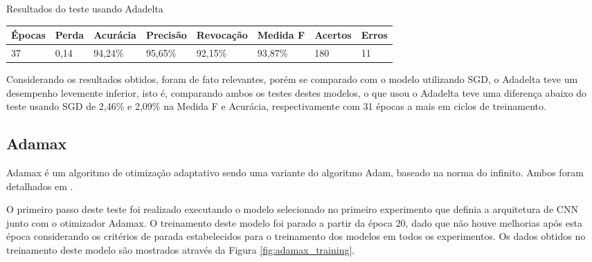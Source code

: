 \documentclass[
	12pt,				%
	oneside,			%
	a4paper,			%
	english,			%
	brazil				%
	]{abntex2ppgsi}
\begin{document}
\begin{quadro}[H]
\caption{Resultados do teste usando Adadelta}
\label{quad:test_adadelta}
\centering
\begin{tabular}{|l|l|l|l|l|l|l|l|}
\cline{1-8}
Épocas & Perda & Acurácia & Precisão & Revocação & Medida F & Acertos & Erros \\ \hline
37 & 0,14 & 94,24\% & 95,65\% & 92,15\% & 93,87\% & 180 & 11 \\
\cline{1-8}
\end{tabular}
\end{quadro}

Considerando os resultados obtidos, foram de fato relevantes, porém se comparado com o modelo utilizando SGD, o Adadelta teve um desempenho levemente inferior, isto é, comparando ambos os testes destes modelos, o que usou o Adadelta teve uma diferença abaixo do teste usando SGD de 2,46\% e 2,09\% na Medida F e Acurácia, respectivamente com 31 épocas a mais em ciclos de treinamento.

\subsection{Adamax}
Adamax é um algoritmo de otimização adaptativo sendo uma variante do algoritmo Adam, baseado na norma do infinito. Ambos foram detalhados em .

O primeiro passo deste teste foi realizado executando o modelo selecionado no primeiro experimento que definia a arquitetura de CNN junto com o otimizador Adamax. O treinamento deste modelo foi parado a partir da época 20, dado que não houve melhorias após esta época considerando os critérios de parada estabelecidos para o treinamento dos modelos em todos os experimentos. Os dados obtidos no treinamento deste modelo são mostrados através da Figura \ref{fig:adamax_training}.
\end{document}
